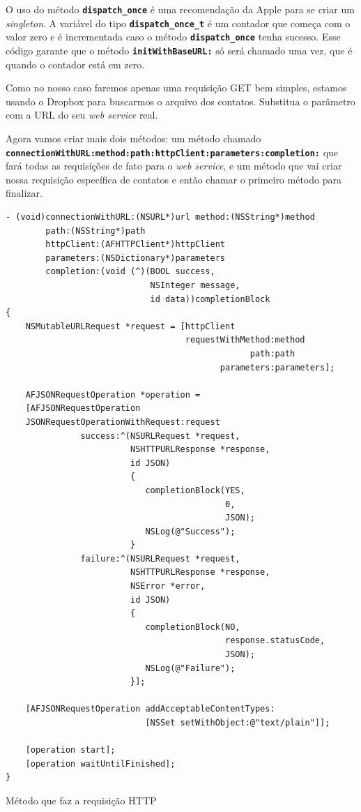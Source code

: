 \documentclass[a4paper,12pt,brazil,oneside]{book}
\begin{document}
O uso do método \texttt{\textbf{dispatch\_once}} é uma recomendação da Apple para se criar um \emph{singleton}. A variável do tipo \texttt{\textbf{dispatch\_once\_t}} é um contador que começa com o valor zero e é incrementada caso o método \texttt{\textbf{dispatch\_once}} tenha sucesso. Esse código garante que o método \texttt{\textbf{initWithBaseURL:}} só será chamado uma vez, que é quando o contador está em zero.

Como no nosso caso faremos apenas uma requisição GET bem simples, estamos usando o Dropbox para buscarmos o arquivo dos contatos. Substitua o parâmetro com a URL do seu \emph{web service} real.

Agora vamos criar mais dois métodos: um método chamado \\ \texttt{\textbf{connectionWithURL:method:path:httpClient:parameters:completion:}} que fará todas as requisições de fato para o \emph{web service}, e um método que vai criar nossa requisição específica de contatos e então chamar o primeiro método para finalizar.

\begin{listing}[H]
\begin{verbatim}
- (void)connectionWithURL:(NSURL*)url method:(NSString*)method
        path:(NSString*)path
        httpClient:(AFHTTPClient*)httpClient
        parameters:(NSDictionary*)parameters
        completion:(void (^)(BOOL success,
                             NSInteger message,
                             id data))completionBlock
{
    NSMutableURLRequest *request = [httpClient
                                    requestWithMethod:method
                                                 path:path
                                           parameters:parameters];
    
    AFJSONRequestOperation *operation =
    [AFJSONRequestOperation
	JSONRequestOperationWithRequest:request
               success:^(NSURLRequest *request,
                         NSHTTPURLResponse *response,
                         id JSON)
                         {
                         	completionBlock(YES,
                         	                0,
                         	                JSON);
                         	NSLog(@"Success");
                         }
               failure:^(NSURLRequest *request,
                         NSHTTPURLResponse *response,
                         NSError *error,
                         id JSON)
                         {
                         	completionBlock(NO,
                         	                response.statusCode,
                         	                JSON);
                         	NSLog(@"Failure");
                         }];
                   
    [AFJSONRequestOperation addAcceptableContentTypes:
                            [NSSet setWithObject:@"text/plain"]];
    
    [operation start];
    [operation waitUntilFinished];
}
\end{verbatim}
\caption{Método que faz a requisição HTTP}
\end{listing}
\end{document}
